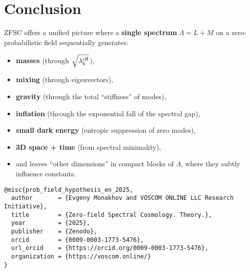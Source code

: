 \documentclass[12pt,a4paper]{article}
\begin{document}
\section{Conclusion}

ZFSC offers a unified picture where a \textbf{single spectrum} \(\Lambda = L + M\) on a zero-probabilistic field sequentially generates:

\begin{itemize}
    \item \textbf{masses} (through \(\sqrt{\lambda_k^{\rm eff}}\)),
    \item \textbf{mixing} (through eigenvectors),
    \item \textbf{gravity} (through the total ``stiffness'' of modes),
    \item \textbf{inflation} (through the exponential fall of the spectral gap),
    \item \textbf{small dark energy} (entropic suppression of zero modes),
    \item \textbf{3D space + time} (from spectral minimality),
    \item and leaves ``other dimensions'' in compact blocks of \(\Lambda\), where they subtly influence constants.
\end{itemize}

\begin{verbatim}
@misc{prob_field_hypothesis_en_2025,
  author       = {Evgeny Monakhov and VOSCOM ONLINE LLC Research Initiative},
  title        = {Zero-field Spectral Cosmology. Theory.},
  year         = {2025},
  publisher    = {Zenodo},
  orcid        = {0009-0003-1773-5476},
  url_orcid    = {https://orcid.org/0009-0003-1773-5476},
  organization = {https://voscom.online/}
}
\end{verbatim}
\end{document}
